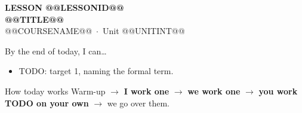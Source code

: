 \documentclass[aspectratio=169, 11pt]{beamer}
\begin{document}
{
\begin{frame}[plain]
  \vspace{2.8cm}\hspace{0.55cm}%
  \begin{minipage}{0.9\textwidth}
    {\color{goldacc}\bfseries\small LESSON @@LESSONID@@}\\[0.5cm]
    {\color{white}\bfseries\LARGE @@TITLE@@}\\[1.2cm]
    {\color{frostmid}\small @@COURSENAME@@~$\cdot$~Unit @@UNITINT@@}
  \end{minipage}
\end{frame}
}

\newcommand{\redink}[1]{{\color{redacc}\bfseries #1}}

\begin{frame}[t, plain]
  By the end of today, I can\ldots
  \begin{itemize}\setlength{\itemsep}{6pt}
    \item TODO: target 1, naming the formal term.
  \end{itemize}
  \begin{block}{How today works}
    Warm-up $\to$ \textbf{I work one} $\to$ \textbf{we work one} $\to$
    \textbf{you work TODO on your own} $\to$ we go over them.
  \end{block}
\end{frame}

\begin{frame}[t, plain]
\end{frame}

\begin{frame}[t, plain]
\end{frame}
\end{document}

